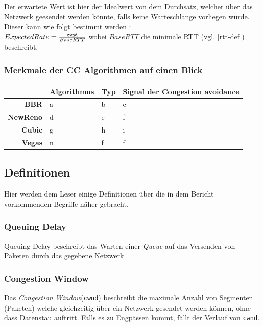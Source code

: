 \documentclass[paper=a4,fontsize=12pt,ngerman]{scrartcl}
\begin{document}
Der erwartete Wert ist hier der Idealwert von dem Durchsatz, welcher über das Netzwerk geesendet werden könnte, 
falls keine Warteschlange vorliegen würde. Dieser kann wie folgt bestimmt werden : \\
$ ExpectedRate = \frac{\text{\texttt{cwnd}}}{BaseRTT}$
wobei $BaseRTT$ die minimale RTT (vgl. \ref{rtt-def}) beschreibt.



\clearpage

\subsubsection{Merkmale der CC Algorithmen auf einen Blick}

\begin{table}[ht]
\centering

\begin{tabular}{r|l|l|l}
   & \textbf{Algorithmus} & \textbf{Typ} & \textbf{Signal der Congestion avoidance} \\ \hline
\textbf{BBR} & a & b & c \\
\textbf{NewReno} & d & e & f \\
\textbf{Cubic} & g & h & i \\
\textbf{Vegas} & n & f & f 

\end{tabular}
\end{table}

\subsection{Definitionen}
Hier werden dem Leser einige Definitionen über die in dem Bericht vorkommenden Begriffe näher gebracht.

\subsubsection{Queuing Delay}
Queuing Delay beschreibt das Warten einer \textit{Queue}
auf das Versenden von Paketen durch das gegebene Netzwerk.


\subsubsection{Congestion Window} \label{cw-def}
Das \textit{Congestion Window}(\texttt{cwnd}) beschreibt die maximale Anzahl von Segmenten (Paketen) welche gleichzeitig über ein Netzwerk gesendet werden können, ohne 
dass Datenstau auftritt. Falls es zu Engpässen kommt, fällt der Verlauf von \texttt{cwnd}.
\end{document}
